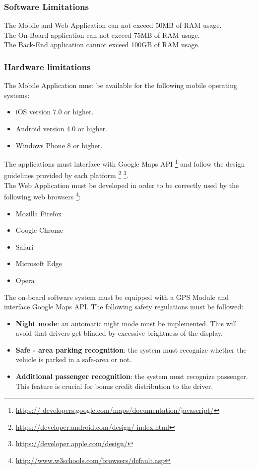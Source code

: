 \documentclass[12pt]{article}
\begin{document}
		\subsubsection{Software Limitations}
			The Mobile and Web Application can not exceed 50MB of RAM usage.\\
			The On-Board application can not exceed 75MB of RAM usage.\\
			The Back-End application cannot exceed 100GB of RAM usage.
		\newpage
		\subsubsection{Hardware limitations}
		The Mobile Application must be available for the following mobile operating systems:
		\begin{itemize}
			\item iOS version 7.0 or higher.
			\item Android version 4.0 or higher.
			\item Windows Phone 8 or higher.
		\end{itemize}
		The applications must interface with Google Maps API \footnote{\url{https://	
		developers.google.com/maps/documentation/javascript/}} and follow the design guidelines 
		provided by each platform \footnote{\url{https://developer.android.com/design/
		index.html}} \footnote{\url{https://developer.apple.com/design/}}.\\
		\newline
		The Web Application must be developed in order to be correctly used by the following 
		web browsers \footnote{\url{http://www.w3schools.com/browsers/default.asp}}:
		\begin{itemize}
			\item Mozilla Firefox
			\item Google Chrome
			\item Safari
			\item Microsoft Edge
			\item Opera
		\end{itemize}
		The on-board software system must be equipped with a GPS Module and interface Google 
		Maps API. The following safety regulations must be followed:
		\begin{itemize}
			\item \textbf{Night mode}: an automatic night mode must be implemented. This will 
				  avoid that drivers get blinded by excessive brightness of the display.
			\item \textbf{Safe - area parking recognition}: the system must recognize whether 
				  the vehicle is parked in a safe-area or not.
			\item \textbf{Additional passenger recognition}: the system must recognize 
				  passenger. This feature is crucial for bonus credit distribution to the 	
				  driver.
		\end{itemize}
	
\end{document}

